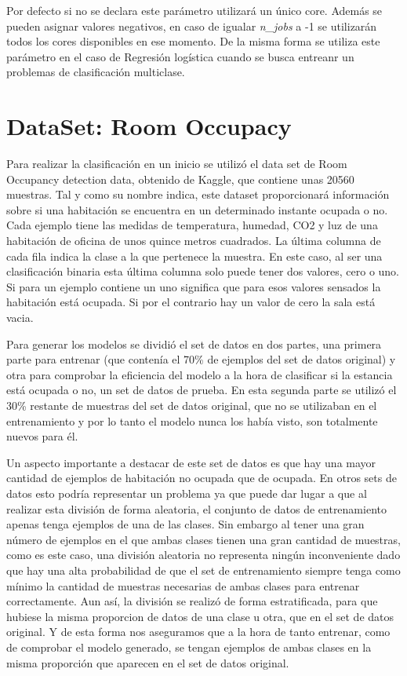 \documentclass[a4paper, 12pt]{book}
\begin{document}
Por defecto si no se declara este parámetro utilizará un único core. Además se pueden asignar valores negativos, en caso de igualar \textit{n\_jobs} a -1 se utilizarán todos los cores disponibles en ese momento. De la misma forma se utiliza este parámetro en el caso de Regresión logística cuando se busca entreanr un problemas de clasificación multiclase.

\section{DataSet: Room Occupacy}

Para realizar la clasificación en un inicio se utilizó el data set de Room Occupancy detection data\cite{DataSetOccupancy}, obtenido de Kaggle, que contiene unas 20560 muestras. Tal y como su nombre indica, este dataset proporcionará información sobre si una habitación se encuentra en un determinado instante ocupada o no. Cada ejemplo tiene las medidas de temperatura, humedad, CO2 y luz de una habitación de oficina de unos quince metros cuadrados. La última columna de cada fila indica la clase a la que pertenece la muestra. En este caso, al ser una clasificación binaria esta última columna solo puede tener dos valores, cero o uno. Si para un ejemplo contiene un uno significa que para esos valores sensados la habitación está ocupada. Si por el contrario hay un valor de cero la sala está vacia. 

Para generar los modelos se dividió el set de datos en dos partes, una primera parte para entrenar (que contenía el 70\% de ejemplos del set de datos original) y otra para comprobar la eficiencia del modelo a la hora de clasificar si la estancia está ocupada o no, un set de datos de prueba. En esta segunda parte se utilizó el 30\% restante de muestras del set de datos original, que no se utilizaban en el entrenamiento y por lo tanto el modelo nunca los había visto, son totalmente nuevos para él.

Un aspecto importante a destacar de este set de datos es que hay una mayor cantidad de ejemplos de habitación no ocupada que de ocupada. En otros sets de datos esto podría representar un problema ya que puede dar lugar a que al realizar esta división de forma aleatoria, el conjunto de datos de entrenamiento apenas tenga ejemplos de una de las clases. Sin embargo al tener una gran número de ejemplos en el que ambas clases tienen una gran cantidad de muestras, como es este caso, una división aleatoria no representa ningún inconveniente dado que hay una alta probabilidad de que el set de entrenamiento siempre tenga como mínimo la cantidad de muestras necesarias de ambas clases para entrenar correctamente. Aun así, la división se realizó de forma estratificada, para que hubiese la misma proporcion de datos de una clase u otra, que en el set de datos original. Y de esta forma nos aseguramos que a la hora de tanto entrenar, como de comprobar el modelo generado, se tengan ejemplos de ambas clases en la misma proporción que aparecen en el set de datos original.
\end{document}
